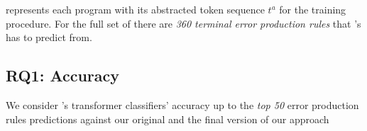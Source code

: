 %
\toolname represents each program with its abstracted token sequence $t^a$ for
the training procedure. For the full set of \python there are \emph{360 terminal
error production rules} that \toolname's has to predict from.



\subsection{RQ1: Accuracy}
\label{sec:eval:accuracy}

We consider \toolname's transformer classifiers' accuracy up to the \emph{top
50} error production rules predictions against our original and the final
version of our approach



